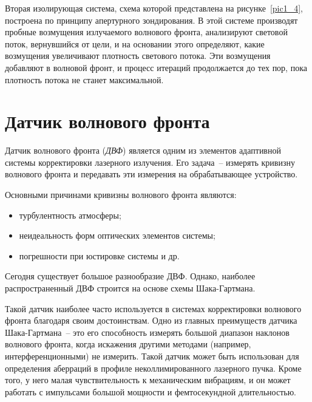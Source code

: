\documentclass[pscyr]{hedwork}
\newcommand{\pic}[1]{\ref{pic#1}}
\begin{document}
Вторая изолирующая система, схема которой представлена на рисунке~\pic{1_4},
построена по принципу апертурного зондирования. В этой системе производят
пробные возмущения излучаемого волнового фронта, анализируют световой поток,
вернувшийся от цели, и на основании этого определяют, какие возмущения
увеличивают плотность светового потока. Эти возмущения добавляют в волновой
фронт, и процесс итераций продолжается до тех пор, пока плотность потока не
станет максимальной. 

\section{Датчик волнового фронта}

Датчик волнового фронта (\emph{ДВФ}) является одним из элементов адаптивной
системы корректировки лазерного излучения. Его задача~-- измерять кривизну
волнового фронта и передавать эти измерения на обрабатывающее устройство.

Основными причинами кривизны волнового фронта являются:
\begin{itemize}
  \item турбулентность атмосферы;
  \item неидеальность форм оптических элементов системы;
  \item погрешности при юстировке системы и др.
\end{itemize}

Сегодня существует большое разнообразие ДВФ. Однако, наиболее распространенный
ДВФ строится на основе схемы Шака-Гартмана.

Такой датчик наиболее часто используется в системах корректировки волнового
фронта благодаря своим достоинствам. Одно из главных преимуществ датчика
Шака-Гартмана~-- это его способность измерять большой диапазон наклонов
волнового фронта, когда искажения другими методами (например,
интерференционными) не измерить. Такой датчик может быть использован для
определения аберраций в профиле неколлимированного лазерного пучка. Кроме того,
у него малая чувствительность к механическим вибрациям, и он может работать с
импульсами большой мощности и фемтосекундной длительностью.
\end{document}
